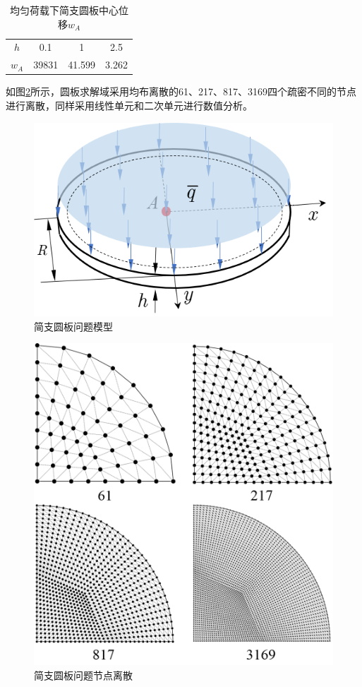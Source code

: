 \begin{table} [!h]
    \centering
    \renewcommand\arraystretch{1.2}
    \caption{均匀荷载下简支圆板中心位移$w_A$}
    \begin{tabular}{cccc}
        \hline
        $h$&0.1   &1      & 2.5   \\
        $w_A$&39831 &41.599 & 3.262 \\
        \hline
    \end{tabular}
\end{table}
如图\ref{ch_5:fig:yuanplatemsh}所示，圆板求解域采用均布离散的61、217、817、3169四个疏密不同的节点进行离散，同样采用线性单元和二次单元进行数值分析。
\begin{figure}[!h]
    \centering 
        \includegraphics[scale=0.8]{figures/shearlocking/yuan plate.png}
        \caption{简支圆板问题模型}\label{ch_5:fig:yuanplate}
\end{figure}
\begin{figure}[!h]
    \centering 
        \includegraphics[scale=0.5]{figures/shearlocking/yuanplatemsh.png}
        \caption{简支圆板问题节点离散}\label{ch_5:fig:yuanplatemsh}
\end{figure}
